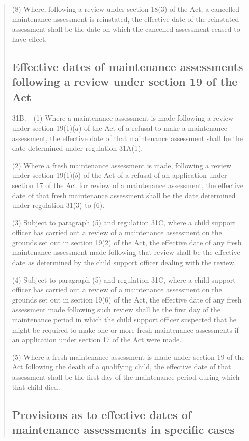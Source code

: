 \documentclass[12pt,a4paper]{article}
\begin{document}
\begin{quotation}
(8) Where, following a review under section 18(3) of the Act, a cancelled maintenance assessment is reinstated, the effective date of the reinstated assessment shall be the date on which the cancelled assessment ceased to have effect.

\subsection*{Effective dates of maintenance assessments following a review under section 19 of the Act}

31B.—(1) Where a maintenance assessment is made following a review under section 19(1)($a$) of the Act of a refusal to make a maintenance assessment, the effective date of that maintenance assessment shall be the date determined under regulation 31A(1).

(2) Where a fresh maintenance assessment is made, following a review under section 19(1)($b$) of the Act of a refusal of an application under section 17 of the Act for review of a maintenance assessment, the effective date of that fresh maintenance assessment shall be the date determined under regulation 31(3) to (6).

(3) Subject to paragraph (5) and regulation 31C, where a child support officer has carried out a review of a maintenance assessment on the grounds set out in section 19(2) of the Act, the effective date of any fresh maintenance assessment made following that review shall be the effective date as determined by the child support officer dealing with the review.

(4) Subject to paragraph (5) and regulation 31C, where a child support officer has carried out a review of a maintenance assessment on the grounds set out in section 19(6) of the Act, the effective date of any fresh assessment made following such review shall be the first day of the maintenance period in which the child support officer suspected that he might be required to make one or more fresh maintenance assessments if an application under section 17 of the Act were made.

(5) Where a fresh maintenance assessment is made under section 19 of the Act following the death of a qualifying child, the effective date of that assessment shall be the first day of the maintenance period during which that child died.

\subsection*{Provisions as to effective dates of maintenance assessments in specific cases}


\end{quotation}
\end{document}
